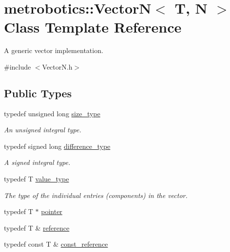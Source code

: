 \hypertarget{classmetrobotics_1_1VectorN}{\section{metrobotics\-:\-:\-Vector\-N$<$ \-T, \-N $>$ \-Class \-Template \-Reference}
\label{classmetrobotics_1_1VectorN}
}


\-A generic vector implementation.  




{\ttfamily \#include $<$\-Vector\-N.\-h$>$}

\subsection*{\-Public \-Types}
\begin{DoxyCompactItemize}
\item 
typedef unsigned long \hyperlink{classmetrobotics_1_1VectorN_a596373b71834214f1c36015df71f3424}{size\-\_\-type}
\begin{DoxyCompactList}\small\item\em \-An unsigned integral type. \end{DoxyCompactList}\item 
typedef signed long \hyperlink{classmetrobotics_1_1VectorN_a5e2e39044c62f6334d9ca146207f2bce}{difference\-\_\-type}
\begin{DoxyCompactList}\small\item\em \-A signed integral type. \end{DoxyCompactList}\item 
typedef \-T \hyperlink{classmetrobotics_1_1VectorN_afca847c633ae36e44196da7285ce7ff6}{value\-\_\-type}
\begin{DoxyCompactList}\small\item\em \-The type of the individual entries (components) in the vector. \end{DoxyCompactList}\item 
typedef \-T $\ast$ \hyperlink{classmetrobotics_1_1VectorN_ac6ad8aadcbd2fbeecde5b48f441be4c9}{pointer}
\item 
typedef \-T \& \hyperlink{classmetrobotics_1_1VectorN_a5856f36e63807f7b75703822a32b4e12}{reference}
\item 
typedef const \-T \& \hyperlink{classmetrobotics_1_1VectorN_a965e5b1a579964b6dea58326f3768bc6}{const\-\_\-reference}
\end{DoxyCompactItemize}
